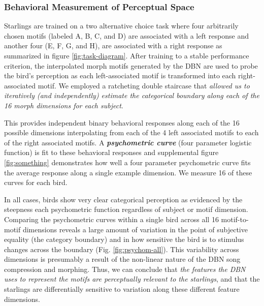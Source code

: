 \subsubsection{Behavioral Measurement of Perceptual Space}


Starlings are trained on a two alternative choice task where four arbitrarily chosen motifs (labeled A, B, C, and D) are associated with a left response and another four (E, F, G, and H), are associated with a right response as summarized in figure \ref{fig:task-diagram}. After training to a stable performance criterion, the interpolated morph motifs generated by the \ac{DBN} are used to probe the bird's perception as each left-associated motif is transformed into each right-associated motif. We employed a ratcheting double staircase that \emph{allowed us to iteratively (and independently) estimate the categorical boundary along each of the 16 morph dimensions for each subject}. 

This provides independent binary behavioral responses along each of the 16 possible dimensions interpolating from each of the 4 left associated motifs to each of the right associated motifs. A \textit{\textbf{psychometric curve}} (four parameter logistic function) is fit to these behavioral responses and supplemental figure \ref{fig:something} demonstrates how well a four parameter psychometric curve fits the average response along a single example dimension. We measure 16 of these curves for each bird.

In all cases, birds show very clear categorical perception as evidenced by the steepness each psychometric function regardless of subject or motif dimension. Comparing the psychometric curves within a single bird across all 16 motif-to-motif dimensions reveals a large amount of variation in the point of subjective equality (the category boundary) and in how sensitive the bird is to stimulus changes across the boundary (Fig. \ref{fig:psychom-all}). This variability across dimensions is presumably a result of the non-linear nature of the \ac{DBN} song compression and morphing. Thus, we can conclude that \emph{the features the DBN uses to represent the motifs are perceptually relevant to the starlings}, and that the starlings are differentially sensitive to variation along these different feature dimensions.


